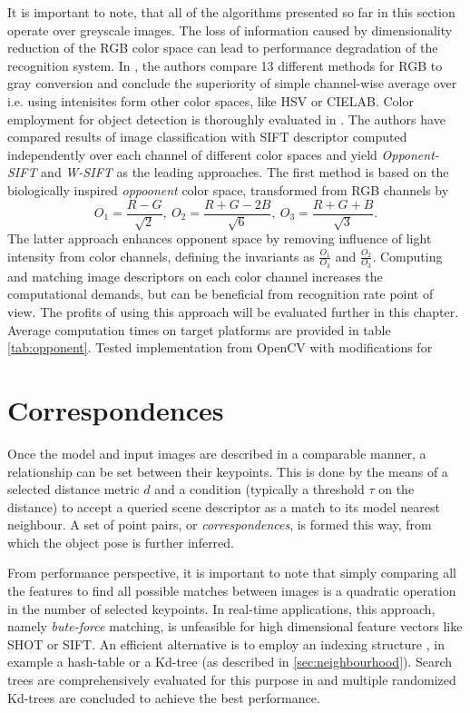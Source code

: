 It is important to note, that all of the algorithms presented so far in this section operate over greyscale images. The loss of information caused by dimensionality reduction of the RGB color space can lead to performance degradation of the recognition system. In \cite{RGB2GREY}, the authors compare 13 different methods for RGB to gray conversion and conclude the superiority of simple channel-wise average over i.e. using intenisites form other color spaces, like HSV or CIELAB. Color employment for object detection is thoroughly evaluated in \cite{ColorComparison}. The authors have compared results of image classification with SIFT descriptor computed independently over each channel of different color spaces and yield \textit{Opponent-SIFT} and \textit{W-SIFT} as the leading approaches. The first method is based on the biologically inspired \textit{oppoonent} color space, transformed from RGB channels by
\begin{equation}
O_1 = \frac{R - G}{\sqrt{2}},\ O_2 = \frac{R + G - 2B}{\sqrt{6}},\ O_3 = \frac{R + G + B}{\sqrt{3}}.
\end{equation}
The latter approach enhances opponent space by removing influence of light intensity from color channels, defining the invariants as $\frac{O_1}{O_3}$ and $\frac{O_2}{O_3}$. Computing and matching image descriptors on each color channel increases the computational demands, but can be beneficial from recognition rate point of view. The profits of using this approach will be evaluated further in this chapter. Average computation times on target platforms are provided in table \ref{tab:opponent}. Tested implementation from OpenCV with modifications for

\section{Correspondences}
\label{sec:correspondences}

Once the model and input images are described in a comparable manner, a relationship can be set between their keypoints. This is done by the means of a selected distance metric $d$ and a condition (typically a threshold $\tau$ on the distance) to accept a queried scene descriptor as a match to its model nearest neighbour. A set of point pairs, or \textit{correspondences}, is formed this way, from which the object pose is further inferred.

From performance perspective, it is important to note that simply comparing all the features to find all possible matches between images is a quadratic operation in the number of selected keypoints. In real-time applications, this approach, namely \textit{bute-force} matching, is unfeasible for high dimensional feature vectors like SHOT or SIFT. An efficient alternative is to employ an indexing structure \cite{szeliski}, in example a hash-table or a Kd-tree (as described in \ref{sec:neighbourhood}). Search trees are comprehensively evaluated for this purpose in \cite{flann} and multiple randomized Kd-trees are concluded to achieve the best performance.

